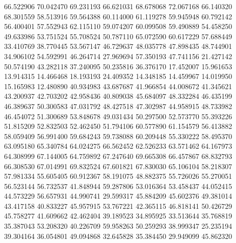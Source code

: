 66.522906
70.042470
69.231193
66.621031
68.678068
72.067168
66.140320
68.301559
58.513916
59.564388
60.114000
61.119278
59.945948
60.792142
56.400401
57.552943
62.115110
59.074207
60.099508
59.490889
54.458250
49.633986
53.751524
55.708524
50.787110
65.072590
60.617229
57.688449
33.410769
38.770445
53.567147
46.729637
48.035778
47.898435
48.744901
34.906102
54.592991
46.264714
27.969694
57.350193
47.741156
21.427142
50.574190
43.282118
37.240095
50.235816
36.376170
17.452007
15.961653
13.914315
14.466468
18.193193
24.409352
14.348185
14.459967
14.019950
15.165983
12.480890
40.934983
43.687687
41.966854
44.008672
41.345621
43.200937
42.703202
42.958436
40.809038
45.684097
48.332284
46.435199
46.389637
50.300583
47.031792
48.427518
47.302987
44.958915
48.733982
46.454072
51.300689
53.848678
49.031434
50.297500
52.573770
55.393226
51.815209
52.832503
52.462450
51.794106
60.577890
61.154579
56.413882
58.059409
56.991400
59.684243
59.738088
60.209448
55.330222
58.495370
63.095180
65.340784
64.024275
66.562452
62.526233
63.571462
64.167973
64.308999
67.144005
64.759892
67.247640
69.665308
66.457867
68.832793
66.308530
67.014991
69.832524
67.601821
67.830030
65.106104
58.218307
57.981334
55.605405
60.912367
58.191075
48.882375
55.726026
55.270051
56.523144
56.732537
41.848944
59.287806
53.016364
53.458437
44.052415
44.573229
56.657931
44.990741
29.599317
45.884209
45.602376
49.381014
43.417158
40.833227
45.957915
53.767221
42.365115
46.818141
50.426729
45.758277
41.609662
42.462404
39.189523
34.895925
33.513644
35.768819
35.387043
53.208320
40.226709
59.958263
50.259293
38.999347
25.235194
39.304164
36.054801
49.094868
32.645828
35.384450
29.949099
45.862320
